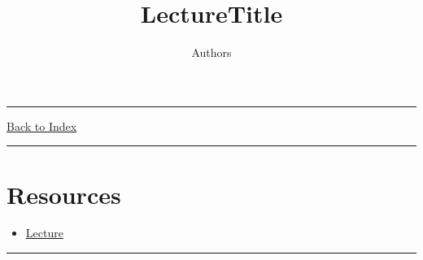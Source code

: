 \documentclass[letterpaper,10pt]{article}
\title{\textbf{LectureTitle}}
\author{Authors}
\newcommand{\panhline}{\begin{center}\rule{\textwidth}{1pt}\end{center}}
\begin{document}
\maketitle

\panhline
\href{../index.html}{Back to Index}

\panhline
\tableofcontents

\section*{Resources}

\begin{itemize}
	\item \href{../../Lectures/LectureFile.pdf}{Lecture}
\end{itemize}

\panhline


	
\end{document}
